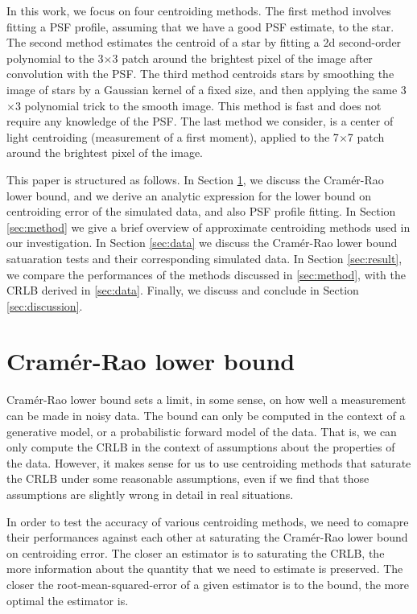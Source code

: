 \documentclass[12pt, preprint]{aastex}
\begin{document}
In this work, we focus on four centroiding methods. The first method
involves fitting a PSF profile, assuming that we have a good PSF estimate, to the star. 
The second method estimates the centroid of a star by fitting a 2d second-order polynomial to
 the 3$\times$3 patch around the brightest pixel of the image after convolution with the PSF. 
The third method centroids stars by
 smoothing the image of stars by a Gaussian kernel of a fixed size,
 and then applying the same 3$\times$3 polynomial trick to the smooth
 image. This method is fast and does not require any knowledge of the 
PSF. The last method we consider, is a center of light centroiding 
(measurement of a first moment), applied to the 
7$\times$7 patch around the brightest pixel of the image.

This paper is structured as follows. In Section \ref{sec:CRLB},
we discuss the Cram\'{e}r-Rao lower bound, and we derive
an analytic expression for the lower bound on centroiding error
of the simulated data, and also PSF profile fitting. 
In Section \ref{sec:method} we give a brief overview of approximate 
centroiding methods used in our investigation.
In Section \ref{sec:data} we discuss the Cram\'{e}r-Rao lower bound satuaration
tests and their corresponding simulated data.
In Section \ref{sec:result}, we compare the performances of the methods
discussed in \ref{sec:method}, with the CRLB derived in \ref{sec:data}. Finally,
 we discuss and conclude in Section \ref{sec:discussion}.               

\section{Cram\'{e}r-Rao lower bound}\label{sec:CRLB}

Cram\'{e}r-Rao lower bound sets a limit, in some sense, on how well a measurement 
can be made in noisy data.  The bound can only be computed in the context of a 
generative model, or a probabilistic forward model of the data.  That is, we can 
only compute the CRLB in the context of assumptions about the properties of the data. 
However, it makes sense for us to use centroiding methods that saturate the CRLB under 
some reasonable assumptions, even if we find that those assumptions are slightly wrong 
in detail in real situations.

In order to test the accuracy of various centroiding methods, we need to comapre their 
performances against each other at saturating the Cram\'{e}r-Rao lower bound on centroiding error. 
The closer an estimator is to saturating the CRLB, the more information about the quantity that we 
need to estimate is preserved. The closer the root-mean-squared-error of a given estimator is to the bound, 
the more optimal the estimator is. 
\end{document}
